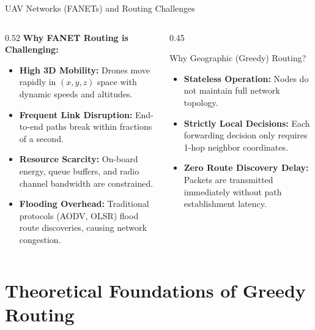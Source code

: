 \documentclass[aspectratio=169,10pt]{beamer}
\begin{document}
\begin{frame}{UAV Networks (FANETs) and Routing Challenges}
  \begin{columns}[T]
    \begin{column}{0.52\textwidth}
      \textbf{Why FANET Routing is Challenging:}
      \begin{itemize}\setlength{\itemsep}{0.4em}
        \item \textbf{High 3D Mobility:} Drones move rapidly in $(x, y, z)$ space with dynamic speeds and altitudes.
        \item \textbf{Frequent Link Disruption:} End-to-end paths break within fractions of a second.
        \item \textbf{Resource Scarcity:} On-board energy, queue buffers, and radio channel bandwidth are constrained.
        \item \textbf{Flooding Overhead:} Traditional protocols (AODV, OLSR) flood route discoveries, causing network congestion.
      \end{itemize}
    \end{column}
    \begin{column}{0.45\textwidth}
      \begin{block}{Why Geographic (Greedy) Routing?}
        \begin{itemize}\setlength{\itemsep}{0.4em}
          \item \textbf{Stateless Operation:} Nodes do not maintain full network topology.
          \item \textbf{Strictly Local Decisions:} Each forwarding decision only requires 1-hop neighbor coordinates.
          \item \textbf{Zero Route Discovery Delay:} Packets are transmitted immediately without path establishment latency.
        \end{itemize}
      \end{block}
    \end{column}
  \end{columns}
\end{frame}

\section{Theoretical Foundations of Greedy Routing}
\end{document}
